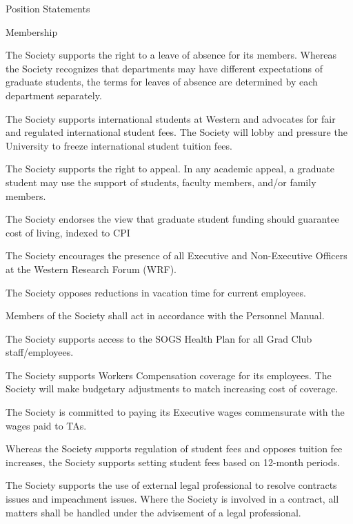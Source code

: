 \begin{longenum}[label*=\thesection.\arabic*., align=left]
\item Position Statements
\begin{longenum}[label*=\arabic*., align=left]
\item Membership
\begin{longenum}[label*=\arabic*., align=left]
\item The Society supports the right to a leave of absence for its members. Whereas the Society recognizes that departments may have different expectations of graduate students, the terms for leaves of absence are determined by each department separately.
\item The Society supports international students at Western and advocates for fair and regulated international student fees. The Society will lobby and pressure the University to freeze international student tuition fees.
\item The Society supports the right to appeal. In any academic appeal, a graduate student may use the support of students, faculty members, and/or family members.
\item The Society endorses the view that graduate student funding should guarantee cost of living, indexed to CPI
\item The Society encourages the presence of all Executive and Non-Executive Officers at the Western Research Forum (WRF).
\item The Society opposes reductions in vacation time for current employees.
\item Members of the Society shall act in accordance with the Personnel Manual.
\item The Society supports access to the SOGS Health Plan for all Grad Club staff/employees.
\item The Society supports Workers Compensation coverage for its employees. The Society will make budgetary adjustments to match increasing cost of coverage.
\item The Society is committed to paying its Executive wages commensurate with the wages paid to TAs.
\item Whereas the Society supports regulation of student fees and opposes tuition fee increases, the Society supports setting student fees based on 12-month periods.
\item The Society supports the use of external legal professional to resolve contracts issues and impeachment issues. Where the Society is involved in a contract, all matters shall be handled under the advisement of a legal professional.

\end{longenum}
\end{longenum}
\end{longenum}
